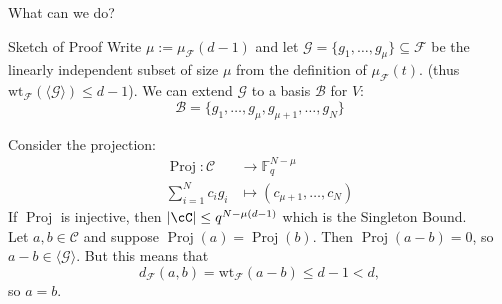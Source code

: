 \begin{frame}{}{What can we do?}
\vspace{-1.5cm}



\end{frame}

\begin{frame}{Sketch of Proof}
    Write $\mu := \mu_{\mathcal{F}}(d-1)$ and let $\mathcal{G} = \{g_1, \ldots, g_\mu\} \subseteq \mathcal{F}$ be the linearly independent subset of size $\mu$ from the definition of \(\mu_{\mathcal{F}}(t)\). \pause (thus \(\mathrm{wt}_{\mathcal{F}}(\mathcal{\langle G \rangle}) \leq d-1\)).
    \pause %
    We can extend $\mathcal{G}$ to a basis $\mathcal{B}$ for $V$:
    \[
    \mathcal{B} = \{g_1, \ldots, g_\mu, g_{\mu+1}, \ldots, g_{N}\}
    \]
    
    \pause %
    Consider the projection:
    \begin{align*}
        \operatorname{Proj}: \mathcal{C} & \to \mathbb{F}_q^{N - \mu} \\
        \sum_{i=1}^{N} c_i g_i & \mapsto (c_{\mu+1}, \ldots, c_{N})
    \end{align*}
   \pause
   If \( \operatorname{Proj}\) is injective, then \(|\cC| \leq q^{N-\mu(d-1)}\) which is the Singleton Bound. \\ \pause 
    Let $a, b \in \mathcal{C}$ and suppose $\operatorname{Proj}(a) = \operatorname{Proj}(b)$. \pause Then $\operatorname{Proj}(a-b) = 0$, so $a - b \in \langle \mathcal{G} \rangle$. \pause But this means that
    \[
    d_{\mathcal{F}}(a,b) = \mathrm{wt}_{\mathcal{F}}(a - b) \leq d - 1 < d,
    \]
    so $a = b$.
\end{frame}


